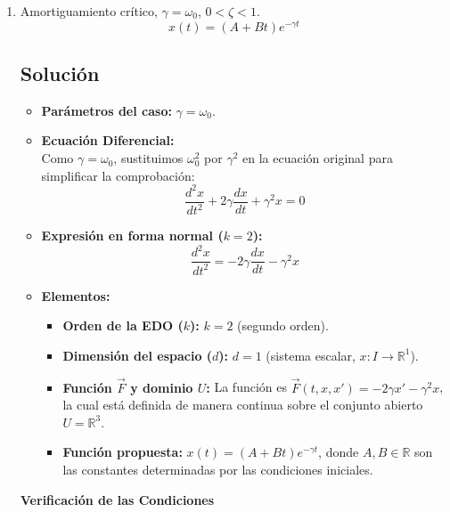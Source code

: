 \begin{enumerate}[label=\arabic*., leftmargin=*]
\begin{enumerate}[label=(\alph*), leftmargin=*]
        \item Amortiguamiento crítico, $\gamma=\omega_{0}$, $0<\zeta<1$.
        \begin{equation*}
            x(t)=(A+Bt)e^{-\gamma t} \tag{4}
        \end{equation*}

        \subsection{Solución}
        \begin{itemize}[leftmargin=*]
            \item \textbf{Parámetros del caso:} $\gamma = \omega_0$.
            
            \item \textbf{Ecuación Diferencial:}\\
            Como $\gamma = \omega_0$, sustituimos $\omega_0^2$ por $\gamma^2$ en la ecuación original para simplificar la comprobación:
            \[ \frac{d^2x}{dt^2} + 2\gamma\frac{dx}{dt} + \gamma^2 x = 0 \]
            
            \item \textbf{Expresión en forma normal ($k = 2$):}
            \[ \frac{d^2x}{dt^2} = -2\gamma\frac{dx}{dt} - \gamma^2 x \]
            
            \item \textbf{Elementos:}
            \begin{itemize}[leftmargin=*]
                \item \textbf{Orden de la EDO ($k$):} $k = 2$ (segundo orden).
                \item \textbf{Dimensión del espacio ($d$):} $d = 1$ (sistema escalar, $x: I \to \mathbb{R}^1$).
                \item \textbf{Función $\vec{F}$ y dominio $U$:} La función es $\vec{F}(t, x, x') = -2\gamma x' - \gamma^2 x$, la cual está definida de manera continua sobre el conjunto abierto $U = \mathbb{R}^3$.
                \item \textbf{Función propuesta:} $x(t) = (A + Bt)e^{-\gamma t}$, donde $A, B \in \mathbb{R}$ son las constantes determinadas por las condiciones iniciales.
            \end{itemize}
        \end{itemize}

        \vspace{0.3cm}
        \noindent\textbf{Verificación de las Condiciones}


\end{enumerate}
\end{enumerate}
